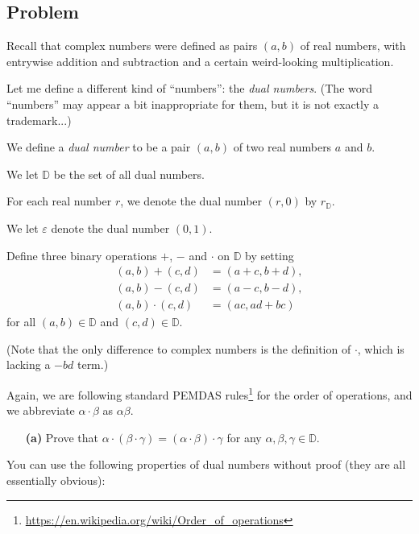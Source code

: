 \documentclass[paper=a4, fontsize=12pt]{scrartcl}%
\theoremstyle{plainsl}
\theoremstyle{definition}
\theoremstyle{remark}
\begin{document}
\subsection{Problem}

Recall that complex numbers were defined as pairs $\left(  a, b \right)  $ of
real numbers, with entrywise addition and subtraction and a certain
weird-looking multiplication.

Let me define a different kind of ``numbers'': the \textit{dual numbers}. (The
word ``numbers'' may appear a bit inappropriate for them, but it is not
exactly a trademark...)

We define a \textit{dual number} to be a pair $\left(  a, b \right)  $ of two
real numbers $a$ and $b$.

We let ${\mathbb{D}}$ be the set of all dual numbers.

For each real number $r$, we denote the dual number $\left(  r, 0 \right)  $
by $r_{\mathbb{D}}$.

We let $\varepsilon$ denote the dual number $\left(  0, 1 \right)  $.

Define three binary operations $+$, $-$ and $\cdot$ on ${\mathbb{D}}$ by
setting
\begin{align}
\left(  a, b \right)  + \left(  c, d \right)   &  = \left(  a+c, b+d \right)
,\\
\left(  a, b \right)  - \left(  c, d \right)   &  = \left(  a-c, b-d \right)
,\\
\left(  a, b \right)  \cdot\left(  c, d \right)   &  = \left(  ac, ad+bc
\right)
\end{align}
for all $\left(  a, b \right)  \in{\mathbb{D}}$ and $\left(  c, d \right)
\in{\mathbb{D}}$.

(Note that the only difference to complex numbers is the definition of $\cdot
$, which is lacking a $-bd$ term.)

Again, we are following standard PEMDAS
rules\footnote{\url{https://en.wikipedia.org/wiki/Order_of_operations}} for
the order of operations, and we abbreviate $\alpha\cdot\beta$ as $\alpha\beta$.

\begin{enumerate}
\item[\textbf{(a)}] Prove that $\alpha\cdot\left(  \beta\cdot\gamma\right)  =
\left(  \alpha\cdot\beta\right)  \cdot\gamma$ for any $\alpha, \beta,
\gamma\in{\mathbb{D}}$.
\end{enumerate}

You can use the following properties of dual numbers without proof (they are
all essentially obvious):
\end{document}
